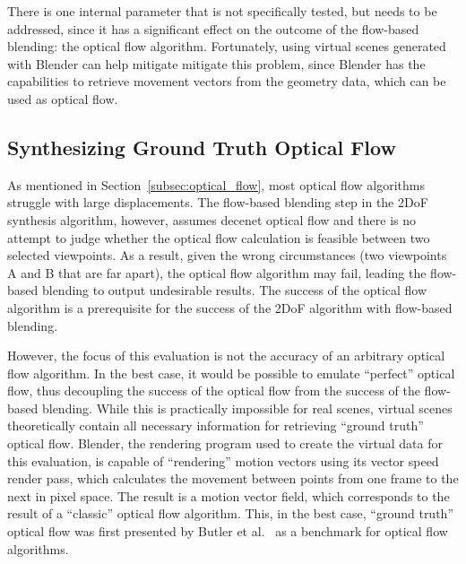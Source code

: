 
There is one internal parameter that is not specifically tested, but needs to be addressed, since it has a significant effect on the outcome of the flow-based blending: the optical flow algorithm. Fortunately, using virtual scenes generated with Blender can help mitigate mitigate this problem, since Blender has the capabilities to retrieve movement vectors from the geometry data, which can be used as optical flow.

\subsection{Synthesizing Ground Truth Optical Flow}
As mentioned in Section~\ref{subsec:optical_flow}, most optical flow algorithms struggle with large displacements. The flow-based blending step in the 2DoF synthesis algorithm, however, assumes decenet optical flow and there is no attempt to judge whether the optical flow calculation is feasible between two selected viewpoints. As a result, given the wrong circumstances (two viewpoints A and B that are far apart), the optical flow algorithm may fail, leading the flow-based blending to output undesirable results. The success of the optical flow algorithm is a prerequisite for the success of the 2DoF algorithm with flow-based blending.

However, the focus of this evaluation is not the accuracy of an arbitrary optical flow algorithm. In the best case, it would be possible to emulate ``perfect'' optical flow, thus decoupling the success of the optical flow from the success of the flow-based blending. While this is practically impossible for real scenes, virtual scenes theoretically contain all necessary information for retrieving ``ground truth'' optical flow. Blender, the rendering program used to create the virtual data for this evaluation, is capable of ``rendering'' motion vectors using its vector speed render pass, which calculates the movement between points from one frame to the next in pixel space. The result is a motion vector field, which corresponds to the result of a ``classic'' optical flow algorithm. This, in the best case, ``ground truth'' optical flow was first presented by Butler et al.\ \cite{sintel} as a benchmark for optical flow algorithms.

